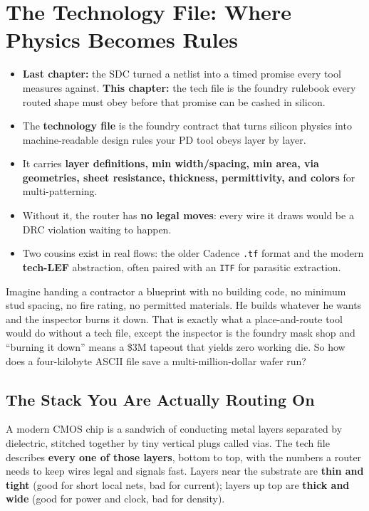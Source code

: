 \chapter{The Technology File: Where Physics Becomes Rules}

\begin{tldr}
\begin{itemize}
  \item \textbf{Last chapter:} the SDC turned a netlist into a timed promise every tool measures against. \textbf{This chapter:} the tech file is the foundry rulebook every routed shape must obey before that promise can be cashed in silicon.
  \item The \textbf{technology file} is the foundry contract that turns silicon physics into machine-readable design rules your PD tool obeys layer by layer.
  \item It carries \textbf{layer definitions, min width/spacing, min area, via geometries, sheet resistance, thickness, permittivity, and colors} for multi-patterning.
  \item Without it, the router has \textbf{no legal moves}: every wire it draws would be a DRC violation waiting to happen.
  \item Two cousins exist in real flows: the older Cadence \texttt{.tf} format and the modern \textbf{tech-LEF} abstraction, often paired with an \texttt{ITF} for parasitic extraction.
\end{itemize}
\end{tldr}

\begin{hook}
Imagine handing a contractor a blueprint with no building code, no minimum stud spacing, no fire rating, no permitted materials. He builds whatever he wants and the inspector burns it down. That is exactly what a place-and-route tool would do without a tech file, except the inspector is the foundry mask shop and \enquote{burning it down} means a \$3M tapeout that yields zero working die. So how does a four-kilobyte ASCII file save a multi-million-dollar wafer run?
\end{hook}

\section{The Stack You Are Actually Routing On}

A modern CMOS chip is a sandwich of conducting metal layers separated by dielectric, stitched together by tiny vertical plugs called vias. The tech file describes \textbf{every one of those layers}, bottom to top, with the numbers a router needs to keep wires legal and signals fast. Layers near the substrate are \textbf{thin and tight} (good for short local nets, bad for current); layers up top are \textbf{thick and wide} (good for power and clock, bad for density).

